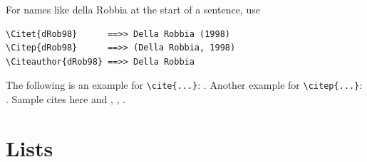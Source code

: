 \documentclass[numbers,webpdf]{ima-authoring-template}%
\theoremstyle{thmstyletwo}%
\numberwithin{equation}{section}
\begin{document}
\noindent
For names like della Robbia at the start of a sentence, use


{%
\begin{verbatim}
\Citet{dRob98}      ==>> Della Robbia (1998)
\Citep{dRob98}      ==>> (Della Robbia, 1998)
\Citeauthor{dRob98} ==>> Della Robbia
\end{verbatim}}


\noindent
The following is an example for \verb+\cite{...}+: \cite{rahman2019centroidb}. Another example for \verb+\citep{...}+: \citep{bahdanau2014neural,imboden2018cardiorespiratory,motiian2017unified,american2013acsm,murphy2012machine,ji20123d}.
Sample cites here \cite{krizhevsky2012imagenet,horvath2018dna} and \cite{pyrkov2018quantitative}, \cite{wang2018face}, \cite{lecun2015deep,zhang2018fine,ravi2016deep}.


\section{Lists}\label{sec9}
\end{document}
